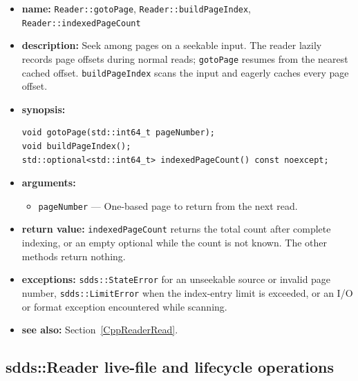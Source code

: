 \documentclass[11pt]{article}
\begin{document}
\begin{itemize}
\item {\bf name:}\newline
{\tt Reader::gotoPage}, {\tt Reader::buildPageIndex},
{\tt Reader::indexedPageCount}
\item {\bf description:}\newline
Seek among pages on a seekable input.  The reader lazily records page offsets
during normal reads; {\tt gotoPage} resumes from the nearest cached offset.
{\tt buildPageIndex} scans the input and eagerly caches every page offset.
\item {\bf synopsis:}
\begin{verbatim}
void gotoPage(std::int64_t pageNumber);
void buildPageIndex();
std::optional<std::int64_t> indexedPageCount() const noexcept;
\end{verbatim}
\item {\bf arguments:}
\begin{itemize}
\item {\tt pageNumber} --- One-based page to return from the next read.
\end{itemize}
\item {\bf return value:}\newline
{\tt indexedPageCount} returns the total count after complete indexing, or an
empty optional while the count is not known.  The other methods return nothing.
\item {\bf exceptions:}\newline
{\tt sdds::StateError} for an unseekable source or invalid page number,
{\tt sdds::LimitError} when the index-entry limit is exceeded, or an I/O or
format exception encountered while scanning.
\item {\bf see also:}\newline
Section~\ref{CppReaderRead}.
\end{itemize}

\subsection{sdds::Reader live-file and lifecycle operations}
\label{CppReaderLive}
\end{document}
